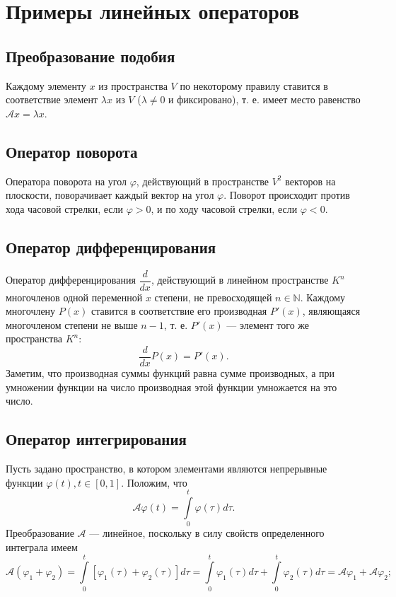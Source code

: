 \documentclass[a5paper, 11pt]{extbook}
\theoremstyle{definition}
\theoremstyle{definition}
\theoremstyle{definition}
\begin{document}
\section{Примеры линейных операторов}

\subsection{Преобразование подобия}

Каждому элементу \(x\) из пространства \(V\) по некоторому правилу ставится в соответствие элемент \(\lambda x\) из \(V\) (\(\lambda \neq 0\) и фиксировано), т. е. имеет место равенство \(\mathcal{A} x = \lambda x\).

\subsection{Оператор поворота}

Оператора поворота на угол \(\varphi\), действующий в пространстве \(V^2\) векторов на плоскости, поворачивает каждый вектор на угол \(\varphi\). Поворот происходит против хода часовой стрелки, если \(\varphi > 0\), и по ходу часовой стрелки, если \(\varphi < 0\).

\subsection{Оператор дифференцирования}

Оператор дифференцирования \(\dfrac{d}{dx}\), действующий в линейном пространстве \(K^n\) многочленов одной переменной \(x\) степени, не превосходящей \(n \in \mathbb{N}\). Каждому многочлену \(P(x)\) ставится в соответствие его производная \(P'(x)\), являющаяся многочленом степени не выше \(n - 1\), т. е. \(P'(x)\) — элемент того же пространства \(K^n\):
\[
    \frac{d}{dx} P(x) = P'(x).
\]
Заметим, что производная суммы функций равна сумме производных, а при умножении функции на число производная этой функции умножается на это число.

\subsection{Оператор интегрирования}

Пусть задано пространство, в котором элементами являются непрерывные функции \(\varphi(t), t \in [0, 1]\). Положим, что
\[
    \mathcal{A} \varphi(t) = \int\limits_0^t \varphi(\tau) d\tau.
\]
Преобразование \(\mathcal{A}\) — линейное, поскольку в силу свойств определенного интеграла имеем
\[
    \mathcal{A} (\varphi_1 + \varphi_2) =
    \int\limits_0^t [\varphi_1(\tau) + \varphi_2(\tau)] d\tau =
    \int\limits_0^t \varphi_1(\tau) d\tau + \int\limits_0^t \varphi_2(\tau) d\tau =
    \mathcal{A} \varphi_1 + \mathcal{A} \varphi_2;
\]
\end{document}
